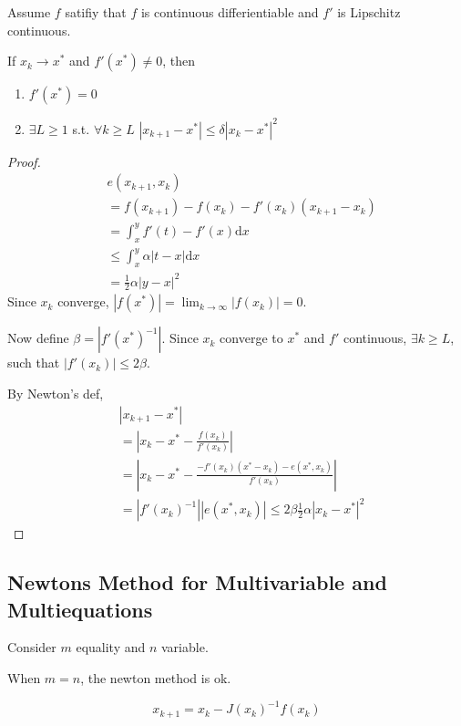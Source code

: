 Assume $f$ satifiy that $f$ is continuous differientiable
and $f'$ is Lipschitz continuous.

\begin{theorem}
  If ${x_k} \rightarrow x^*$ and $f'(x^*) \neq 0$, then
  \begin{enumerate}
    \item $f'(x^*) = 0$
    \item $\exists L \geq 1$ s.t. $\forall k \geq L$
    $ |x_{k+1} - x^*| \leq \delta |x_k - x^*|^2 $
  \end{enumerate}
\end{theorem}
\begin{proof}
  \begin{align}
    &e(x_{k+1}, x_k) \nonumber \\
    &= f(x_{k+1}) - f(x_k) - f'(x_k)(x_{k+1} - x_k) \nonumber \\
    &= \int_x^y f'(t) - f'(x) \mathrm{d}x \nonumber \\
    &\leq \int_x^y \alpha |t - x| \mathrm{d}x \nonumber \\
    &=\frac{1}{2} \alpha |y-x|^2 \nonumber
  \end{align}
  Since ${x_k}$ converge, $|f(x^*)| = \lim_{k \rightarrow \infty}|f(x_k)| = 0$.

  Now define $\beta = |f'(x^*)^{-1}|$.
  Since ${x_k}$ converge to $x^*$ and $f'$ continuous, $\exists k \geq L$,
  such that $|f'(x_k)| \leq 2\beta$.
  
  By Newton's def,
  \begin{align}
    &|x_{k+1} - x^*| \nonumber \\
    &= |x_k - x^* - \frac{f(x_k)}{f'(x_k)}| \nonumber \\
    &= |x_k - x^* - \frac{-f'(x_k)(x^* - x_k) - e(x^*, x_k)}{f'(x_k)}| \nonumber \\ 
    &= |f'(x_k)^{-1}||e(x^*, x_k)|
    \leq 2\beta \frac{1}{2}\alpha |x_k - x^*|^2
  \end{align}
\end{proof}

\subsection{Newtons Method for Multivariable and Multiequations}

Consider $m$ equality and $n$ variable.

When $m = n$, the newton method is ok.

\[
  x_{k+1} = x_k - J(x_k)^{-1}f(x_k) 
\]

